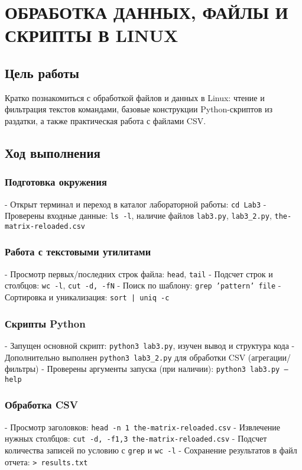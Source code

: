 \chapter{ОБРАБОТКА ДАННЫХ, ФАЙЛЫ И СКРИПТЫ В LINUX}

\section{Цель работы}
Кратко познакомиться с обработкой файлов и данных в Linux: чтение и фильтрация текстов командами, базовые конструкции Python-скриптов из раздатки, а также практическая работа с файлами CSV.

\section{Ход выполнения}

\subsection{Подготовка окружения}
- Открыт терминал и переход в каталог лабораторной работы: \texttt{cd Lab3}
- Проверены входные данные: \texttt{ls -l}, наличие файлов \texttt{lab3.py}, \texttt{lab3\_2.py}, \texttt{the-matrix-reloaded.csv}

\subsection{Работа с текстовыми утилитами}
- Просмотр первых/последних строк файла: \texttt{head}, \texttt{tail}
- Подсчет строк и столбцов: \texttt{wc -l}, \texttt{cut -d, -fN}
- Поиск по шаблону: \texttt{grep 'pattern' file}
- Сортировка и уникализация: \texttt{sort | uniq -c}

\subsection{Скрипты Python}
- Запущен основной скрипт: \texttt{python3 lab3.py}, изучен вывод и структура кода
- Дополнительно выполнен \texttt{python3 lab3\_2.py} для обработки CSV (агрегации/фильтры)
- Проверены аргументы запуска (при наличии): \texttt{python3 lab3.py --help}

\subsection{Обработка CSV}
- Просмотр заголовков: \texttt{head -n 1 the-matrix-reloaded.csv}
- Извлечение нужных столбцов: \texttt{cut -d, -f1,3 the-matrix-reloaded.csv}
- Подсчет количества записей по условию с \texttt{grep} и \texttt{wc -l}
- Сохранение результатов в файл отчета: \texttt{> results.txt}

